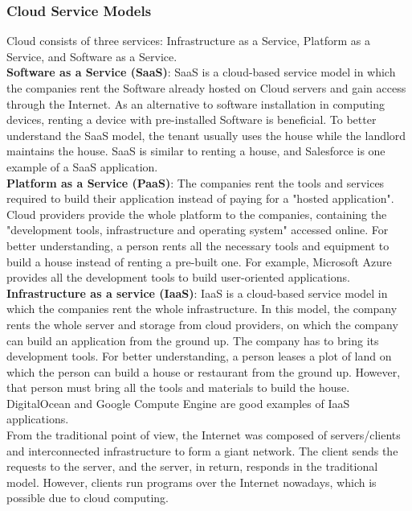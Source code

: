 \documentclass[12pt,a4paper]{article}
\begin{document}
\subsubsection{Cloud Service Models}

Cloud consists of three services: Infrastructure as a Service, Platform as a Service, and Software as a Service. \\

\textbf{Software as a Service (SaaS)}: SaaS is a cloud-based service model in which the companies rent the Software already hosted on Cloud servers and gain access through the Internet. As an alternative to software installation in computing devices, renting a device with pre-installed Software is beneficial. To better understand the SaaS model, the tenant usually uses the house while the landlord maintains the house. SaaS is similar to renting a house, and Salesforce is one example of a SaaS application. \cite{r15} \\

\textbf{Platform as a Service (PaaS)}: The companies rent the tools and services required to build their application instead of paying for a "hosted application". Cloud providers provide the whole platform to the companies, containing the "development tools, infrastructure and operating system" accessed online. For better understanding, a person rents all the necessary tools and equipment to build a house instead of renting a pre-built one. For example, Microsoft Azure provides all the development tools to build user-oriented applications. \cite{r15} \\

\textbf{Infrastructure as a service (IaaS)}: IaaS is a cloud-based service model in which the companies rent the whole infrastructure. In this model, the company rents the whole server and storage from cloud providers, on which the company can build an application from the ground up. The company has to bring its development tools. For better understanding, a person leases a plot of land on which the person can build a house or restaurant from the ground up. However, that person must bring all the tools and materials to build the house. DigitalOcean and Google Compute Engine are good examples of IaaS applications. \cite{r15} \\

From the traditional point of view, the Internet was composed of servers/clients and interconnected infrastructure to form a giant network. The client sends the requests to the server, and the server, in return, responds in the traditional model. However, clients run programs over the Internet nowadays, which is possible due to cloud computing.\cite{r15}
\end{document}
